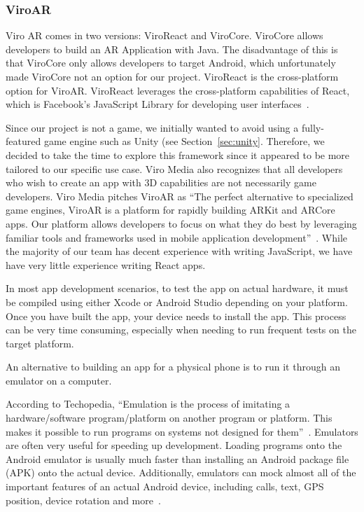 \documentclass[a4paper, 10pt, american, titlepage]{article}
\begin{document}
\subsubsection{ViroAR}
\label{sec:viroAR}

Viro AR comes in two versions: ViroReact and ViroCore\autocite{facebook2019}.
ViroCore allows developers to build an AR Application with Java. The
disadvantage of this is that ViroCore only allows developers to target Android,
which unfortunately made ViroCore not an option for our project. ViroReact is
the cross-platform option for ViroAR. ViroReact leverages the cross-platform
capabilities of React, which is Facebook's JavaScript Library for developing
user interfaces~\autocite{facebook2019}.

Since our project is not a game, we initially wanted to avoid using a
fully-featured game engine such as Unity (see Section~\ref{sec:unity}.
Therefore, we decided to take the time to explore this framework since it
appeared to be more tailored to our specific use case. Viro Media also
recognizes that all developers who wish to create an app with 3D capabilities
are not necessarily game developers. Viro Media pitches ViroAR as ``The
perfect alternative to specialized game engines, ViroAR is a platform for
rapidly building ARKit and ARCore apps. Our platform allows developers to focus
on what they do best by leveraging familiar tools and frameworks used in mobile
application development''~\autocite{viro2019}. While the majority of our team
has decent experience with writing JavaScript, we have have very little experience
writing React apps.

In most app development scenarios, to test the app on actual hardware, it must
be compiled using either Xcode or Android Studio depending on your platform.
Once you have built the app, your device needs to install the app. This process
can be very time consuming, especially when needing to run frequent tests on
the target platform.

An alternative to building an app for a physical phone is to run it through an
emulator on a computer.

According to Techopedia, ``Emulation is the process of imitating a
hardware/software program/platform on another program or platform. This makes
it possible to run programs on systems not designed for
them''~\autocite{techopedia2019}. Emulators are often very useful for speeding
up development. Loading programs onto the Android emulator is usually much
faster than installing an Android package file (APK) onto the actual device.
Additionally, emulators can mock almost all of the important features of an
actual Android device, including calls, text, GPS position, device rotation and
more~\autocite{androidemulator}.
\end{document}
